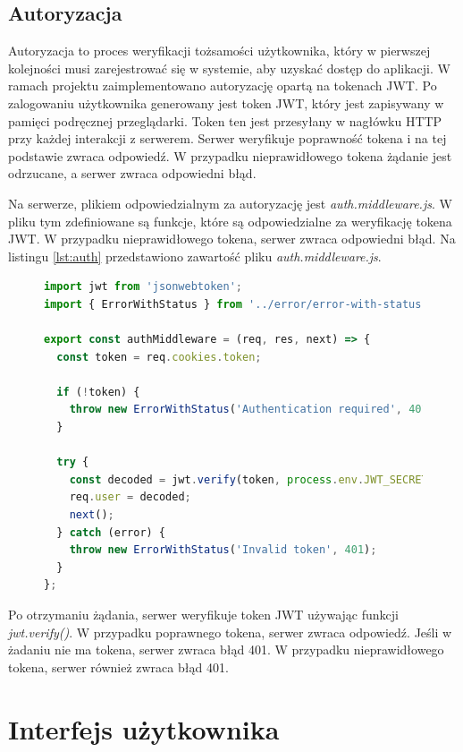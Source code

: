 \subsection{Autoryzacja}
Autoryzacja to proces weryfikacji tożsamości użytkownika, który w pierwszej kolejności musi zarejestrować się w systemie, aby uzyskać dostęp do aplikacji. W ramach projektu zaimplementowano autoryzację opartą na tokenach JWT. Po zalogowaniu użytkownika generowany jest token JWT, który jest zapisywany w pamięci podręcznej przeglądarki. Token ten jest przesyłany w nagłówku HTTP przy każdej interakcji z serwerem. Serwer weryfikuje poprawność tokena i na tej podstawie zwraca odpowiedź. W przypadku nieprawidłowego tokena żądanie jest odrzucane, a serwer zwraca odpowiedni błąd.

Na serwerze, plikiem odpowiedzialnym za autoryzację jest \textit{auth.middleware.js}. W pliku tym zdefiniowane są funkcje, które są odpowiedzialne za weryfikację tokena JWT. W przypadku nieprawidłowego tokena, serwer zwraca odpowiedni błąd. Na listingu \ref{lst:auth} przedstawiono zawartość pliku \textit{auth.middleware.js}.

\begin{figure}[H]
\begin{lstlisting}[language=JavaScript, caption=Przykładowa definicja autoryzacji, label=lst:auth]
import jwt from 'jsonwebtoken';
import { ErrorWithStatus } from '../error/error-with-status.js';

export const authMiddleware = (req, res, next) => {
  const token = req.cookies.token;

  if (!token) {
    throw new ErrorWithStatus('Authentication required', 401);
  }

  try {
    const decoded = jwt.verify(token, process.env.JWT_SECRET);
    req.user = decoded;
    next();
  } catch (error) {
    throw new ErrorWithStatus('Invalid token', 401);
  }
};
\end{lstlisting}
\end{figure}

Po otrzymaniu żądania, serwer weryfikuje token JWT używając funkcji \textit{jwt.verify()}. W przypadku poprawnego tokena, serwer zwraca odpowiedź. Jeśli w żadaniu nie ma tokena, serwer zwraca błąd 401. W przypadku nieprawidłowego tokena, serwer również zwraca błąd 401.

\section{Interfejs użytkownika}

